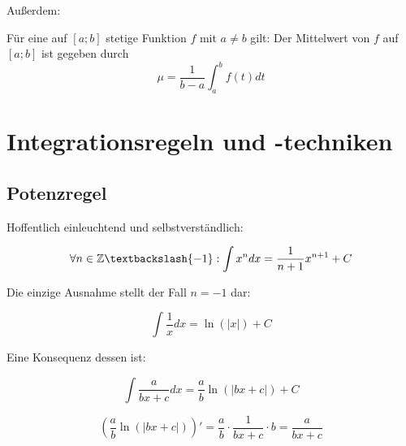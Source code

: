Außerdem:
\begin{Definition}
  Für eine auf $[a;b]$ stetige Funktion $f$ mit $a \neq b$ gilt: Der Mittelwert von $f$ auf $[a;b]$ ist gegeben durch $$\mu = \dfrac{1}{b-a} \int_a^b f(t)dt$$
\end{Definition}

\section{Integrationsregeln und -techniken}

\subsection{Potenzregel}
Hoffentlich einleuchtend und selbstverständlich:
\begin{Theorem}
  $$\forall n \in \Z \textbackslash \{ -1\}:\int  x^n dx = \frac{1}{n+1}x^{n+1} + C$$
\end{Theorem}
\begin{Bemerkung}
  Die einzige Ausnahme stellt der Fall $n=-1$ dar:
\end{Bemerkung}
\begin{Theorem}
  $$\int \dfrac{1}{x} dx = \ln(|x|) + C$$
\end{Theorem}
Eine Konsequenz dessen ist:
\begin{Theorem}
  $$\int \dfrac{a}{bx+c} dx = \dfrac{a}{b}\ln(|bx+c|) + C$$
\end{Theorem}
\begin{Beweis}
  $$\left(\dfrac{a}{b}\ln(|bx+c|)\right)' = \dfrac{a}{b}\cdot \dfrac{1}{bx+c}\cdot b = \dfrac{a}{bx+c}$$
\end{Beweis}

